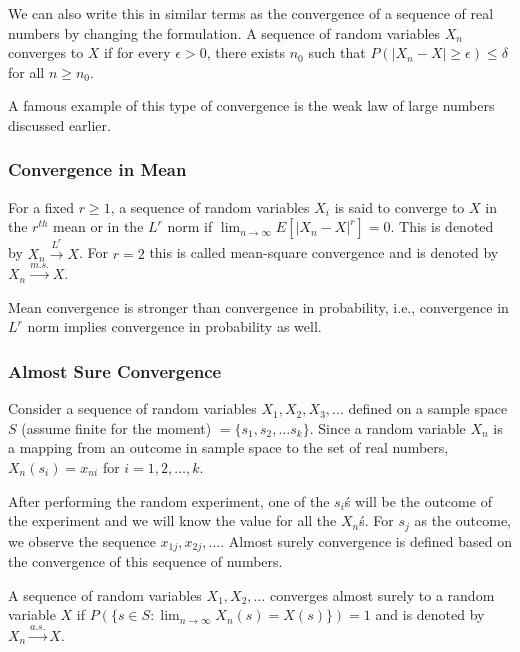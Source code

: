 \documentclass[../probability-notes.tex]{subfiles}
\begin{document}
    We can also write this in similar terms as the convergence of a sequence of real numbers by changing the formulation. A sequence of random variables $X_{n}$ converges to $X$ if for every $\epsilon > 0$, there exists $n_{0}$ such that $P(\lvert X_{n} - X \rvert \geq \epsilon) \leq \delta$ for all $n \geq n_{0}$.\newline

    A famous example of this type of convergence is the weak law of large numbers discussed earlier.

    \subsubsection{Convergence in Mean}
    For a fixed $r \geq 1$, a sequence of random variables $X_{i}$ is said to converge to $X$ in the $r^{th}$ mean or in the $L^{r}$ norm if $\lim_{n \to \infty} E[\lvert X_{n} - X \rvert^{r}] = 0$. This is denoted by $X_{n} \overset{L^{r}}\rightarrow X$. For $r=2$ this is called mean-square convergence and is denoted by $X_{n} \overset{m.s.}\rightarrow X$.\newline

    Mean convergence is stronger than convergence in probability, i.e., convergence in $L^{r}$ norm implies convergence in probability as well.

    \subsubsection{Almost Sure Convergence}
    Consider a sequence of random variables $X_{1}, X_{2}, X_{3}, \ldots$ defined on a sample space $S$ (assume finite for the moment) $= \{s_{1}, s_{2}, \ldots s_{k}\}$. Since a random variable $X_{n}$ is a mapping from an outcome in sample space to the set of real numbers, $X_{n}(s_{i}) = x_{ni}$ for $i=1,2,\ldots,k$.\newline

    After performing the random experiment, one of the $s_{i}$\'s will be the outcome of the experiment and we will know the value for all the $X_{n}$\'s. For $s_{j}$ as the outcome, we observe the sequence $x_{1j}, x_{2j}, \ldots$. Almost surely convergence is defined based on the convergence of this sequence of numbers.\newline

    A sequence of random variables $X_{1}, X_{2}, \ldots$ converges almost surely to a random variable $X$ if $P(\{s \in S:\lim_{n \to \infty} X_{n}(s) = X(s)\}) = 1$ and is denoted by $X_{n} \overset{a.s.}\rightarrow X$.\newline
\end{document}
